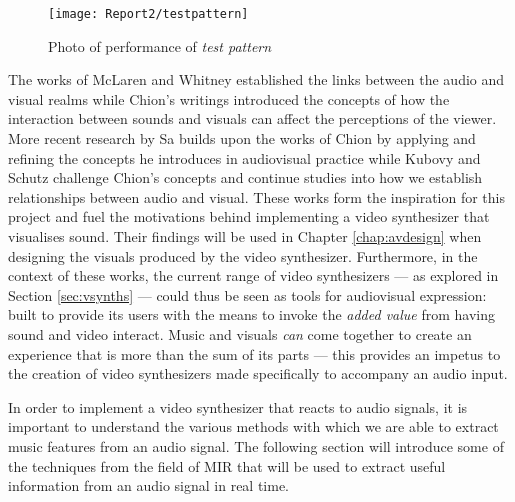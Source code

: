 \documentclass[../initial_thesis.tex]{subfiles}
\begin{document}
\begin{figure}
  \texttt{[image: Report2/testpattern]}
  \centering
  \caption{Photo of performance of \textit{test pattern} \cite{Ikeda}}
  \label{fig:testpattern}
\end{figure}

\vspace{\baselineskip}
The works of McLaren and Whitney established the links between the audio and visual realms while Chion's writings introduced the concepts of how the interaction between sounds and visuals can affect the perceptions of the viewer. More recent research by Sa builds upon the works of Chion by applying and refining the concepts he introduces in audiovisual practice while Kubovy and Schutz challenge Chion's concepts and continue studies into how we establish relationships between audio and visual. These works form the inspiration for this project and fuel the motivations behind implementing a video synthesizer that visualises sound. Their findings will be used in Chapter \ref{chap:avdesign} when designing the visuals produced by the video synthesizer. Furthermore, in the context of these works, the current range of video synthesizers --- as explored in Section \ref{sec:vsynths} --- could thus be seen as tools for audiovisual expression: built to provide its users with the means to invoke the \emph{added value} from having sound and video interact. Music and visuals \emph{can} come together to create an experience that is more than the sum of its parts --- this provides an impetus to the creation of video synthesizers made specifically to accompany an audio input. \par

In order to implement a video synthesizer that reacts to audio signals, it is important to understand the various methods with which we are able to extract music features from an audio signal. The following section will introduce some of the techniques from the field of MIR that will be used to extract useful information from an audio signal in real time. %
\end{document}
